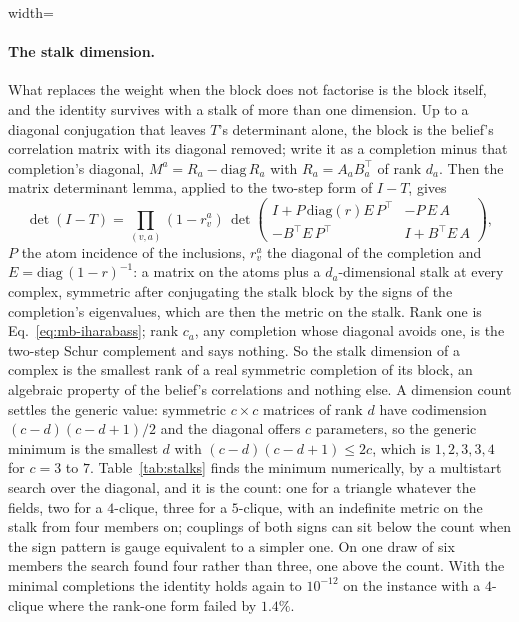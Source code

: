 \begin{table}[tb]
\centering
\begin{adjustbox}{width=\linewidth}

\end{adjustbox}
\caption{\textbf{Instance against ensemble.} The threshold at which the
chygraph Bethe Hessian's gap closes on instances of $3200$ atoms, mean and
spread over eight instances, against the branching-matrix threshold of
Eq.~\eqref{eq:branch}. Generated by
.}
\label{tab:bethehessian}
\end{table}

\paragraph{The stalk dimension.} What replaces the weight when the
block does not factorise is the block itself, and the identity survives
with a stalk of more than one dimension. Up to a diagonal conjugation
that leaves $T$'s determinant alone, the block is the belief's
correlation matrix with its diagonal removed; write it as a completion
minus that completion's diagonal, $M^{a}=R_{a}-\mathrm{diag}\,R_{a}$ with
$R_{a}=A_{a}B_{a}^{\top}$ of rank $d_{a}$. Then the matrix determinant
lemma, applied to the two-step form of $I-T$, gives
\begin{equation}
  \det(I-T)=\prod_{(v,a)}(1-r^{a}_{v})\,
  \det\begin{pmatrix}
    I+P\,\mathrm{diag}(r)E\,P^{\top} & -P\,E\,A\\
    -B^{\top}E\,P^{\top} & I+B^{\top}E\,A
  \end{pmatrix},
  \label{eq:mb-matrixweighted}
\end{equation}
$P$ the atom incidence of the inclusions, $r^{a}_{v}$ the diagonal of the
completion and $E=\mathrm{diag}\,(1-r)^{-1}$: a matrix on the atoms plus a
$d_{a}$-dimensional stalk at every complex, symmetric after conjugating
the stalk block by the signs of the completion's eigenvalues, which are
then the metric on the stalk. Rank one is Eq.~\eqref{eq:mb-iharabass};
rank $c_{a}$, any completion whose diagonal avoids one, is the two-step
Schur complement and says nothing. So the stalk dimension of a complex
is the smallest rank of a real symmetric completion of its block, an
algebraic property of the belief's correlations and nothing else. A
dimension count settles the generic value: symmetric $c\times c$
matrices of rank $d$ have codimension $(c-d)(c-d+1)/2$ and the diagonal
offers $c$ parameters, so the generic minimum is the smallest $d$ with
$(c-d)(c-d+1)\le2c$, which is $1,2,3,3,4$ for $c=3$ to $7$.
Table~\ref{tab:stalks} finds the minimum numerically, by a multistart
search over the diagonal, and it is the count: one for a triangle
whatever the fields, two for a $4$-clique, three for a $5$-clique, with
an indefinite metric on the stalk from four members on; couplings of
both signs can sit below the count when the sign pattern is gauge
equivalent to a simpler one. On one draw of six
members the search found four rather than three, one above the count.
With the minimal completions
the identity holds again to $10^{-12}$ on the instance with a $4$-clique
where the rank-one form failed by $1.4\%$.

